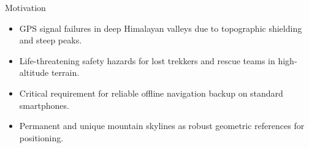\begin{frame}{Motivation}
    \begin{itemize}
        \item GPS signal failures in deep Himalayan valleys due to topographic shielding and steep peaks.
        \item Life-threatening safety hazards for lost trekkers and rescue teams in high-altitude terrain.
        \item Critical requirement for reliable offline navigation backup on standard smartphones.
        \item Permanent and unique mountain skylines as robust geometric references for positioning.
    \end{itemize}
\end{frame}